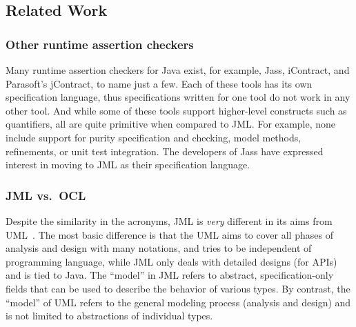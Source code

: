 \subsection{Related Work}
\label{related}

\subsubsection{Other runtime assertion checkers}

Many runtime assertion checkers for Java exist, for example, Jass,
iContract, and Parasoft's jContract, to name just a few.  Each of
these tools has its own specification language, thus specifications
written for one tool do not work in any other tool.  And while some of
these tools support higher-level constructs such as quantifiers, all
are quite primitive when compared to JML\@.  For example, none include
support for purity specification and checking, model methods,
refinements, or unit test integration.  The developers of Jass have
expressed interest in moving to JML as their specification language.


\subsubsection{JML vs.\ OCL}

Despite the similarity in the acronyms, JML is {\em very} different in
its aims from UML~\cite{RumbaughJacobsonBooch98}.
The most basic difference is that the UML aims to cover all phases of
analysis and design with many notations, and tries to be independent
of programming language, while JML only deals with detailed designs
(for APIs) and is tied to Java.  The ``model'' in
JML refers to abstract, specification-only fields that can be used to
describe the behavior of various types.  By contrast, the ``model'' of
UML refers to the general modeling process (analysis and design) and
is not limited to abstractions of individual types.

